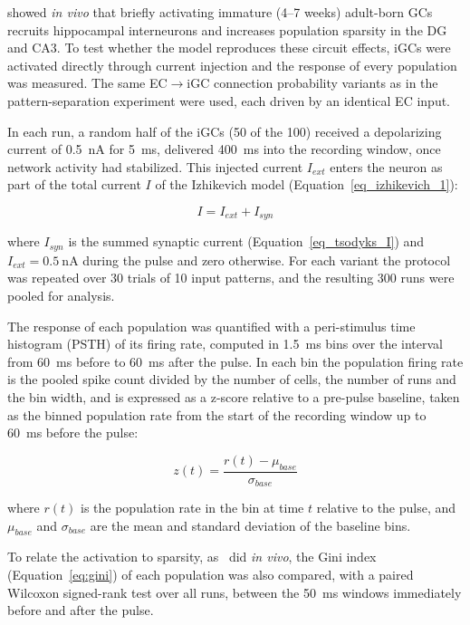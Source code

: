 \textcite{mchughAdultborn2022} showed \textit{in vivo} that briefly activating immature (4--7 weeks) adult-born GCs recruits
hippocampal interneurons and increases population sparsity in the DG and CA3. To test whether the model reproduces these circuit
effects, iGCs were activated directly through current injection and the response of every population was measured. The same
EC$\to$iGC connection probability variants as in the pattern-separation experiment were used, each driven by an identical EC
input.

In each run, a random half of the iGCs (50 of the 100) received a depolarizing current of \SI{0.5}{\nano\ampere} for
\SI{5}{\milli\second}, delivered \SI{400}{\milli\second} into the recording window, once network activity had stabilized. This
injected current $I_{ext}$ enters the neuron as part of the total current $I$ of the Izhikevich model
(Equation~\ref{eq_izhikevich_1}):

\begin{equation}
    \label{eq:i_ext}
    I = I_{ext} + I_{syn}
\end{equation}

where $I_{syn}$ is the summed synaptic current (Equation~\ref{eq_tsodyks_I}) and $I_{ext} = \SI{0.5}{\nano\ampere}$ during the
pulse and zero otherwise. For each variant the protocol was repeated over 30 trials of 10 input patterns, and the resulting 300
runs were pooled for analysis.

The response of each population was quantified with a peri-stimulus time histogram (PSTH) of its firing rate, computed in
\SI{1.5}{\milli\second} bins over the interval from \SI{60}{\milli\second} before to \SI{60}{\milli\second} after the pulse. In
each bin the population firing rate is the pooled spike count divided by the number of cells, the number of runs and the bin
width, and is expressed as a z-score relative to a pre-pulse baseline, taken as the binned population rate from the start of the
recording window up to \SI{60}{\milli\second} before the pulse:

\begin{equation}
    \label{eq:psth_z}
    z(t) = \frac{r(t) - \mu_{base}}{\sigma_{base}}
\end{equation}

where $r(t)$ is the population rate in the bin at time $t$ relative to the pulse, and $\mu_{base}$ and $\sigma_{base}$ are the
mean and standard deviation of the baseline bins.

To relate the activation to sparsity, as~\textcite{mchughAdultborn2022} did \textit{in vivo}, the Gini index
(Equation~\ref{eq:gini}) of each population was also compared, with a paired Wilcoxon signed-rank test over all runs, between the
\SI{50}{\milli\second} windows immediately before and after the pulse.

